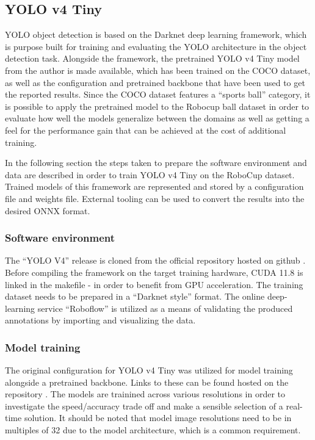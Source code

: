 \documentclass[a4paper,twoside,12pt]{report}
\begin{document}
\subsection{YOLO v4 Tiny}

YOLO object detection is based on the Darknet deep learning framework, which is purpose built for training and evaluating the YOLO architecture in the object detection task. Alongside the framework, the pretrained YOLO v4 Tiny \citep{yolov4tiny} model from the author is made available, which has been trained on the COCO dataset, as well as the configuration and pretrained backbone that have been used to get the reported results. Since the COCO dataset features a ``sports ball'' category, it is possible to apply the pretrained model to the Robocup ball dataset in order to evaluate how well the models generalize between the domains as well as getting a feel for the performance gain that can be achieved at the cost of additional training.

In the following section the steps taken to prepare the software environment and data are described in order to train YOLO v4 Tiny on the RoboCup dataset. Trained models of this framework are represented and stored by a configuration file and weights file. External tooling can be used to convert the results into the desired ONNX format. 

\subsubsection{Software environment}

 The ``YOLO V4'' release is cloned from the official repository hosted on github \citep{yolov4repo}. Before compiling the framework on the target training hardware, CUDA 11.8 is linked in the makefile - in order to benefit from GPU acceleration. The training dataset needs to be prepared in a ``Darknet style'' format. The online deep-learning service ``Roboflow'' \citep{roboflow} is utilized as a means of validating the produced annotations by importing and visualizing the data. 

\subsubsection{Model training}

The original configuration for YOLO v4 Tiny was utilized for model training alongside a pretrained backbone. Links to these can be found hosted on the repository \citep{yolov4repo}. The models are trainined across various resolutions in order to investigate the speed/accuracy trade off and make a sensible selection of a real-time solution. It should be noted that model image resolutions need to be in multiples of 32 due to the model architecture, which is a common requirement.
\end{document}
